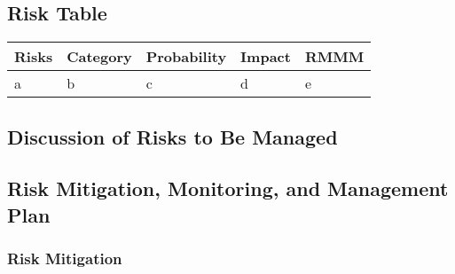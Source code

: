 \documentclass[english,12pt]{article}
\begin{document}
\subsection{Risk Table}
\begin{table}[H]
  \begin{center}
    \begin{tabular}[c]{|l|l|l|l|l|}
      \hline
      \multicolumn{1}{|c|}{\textbf{Risks}} & 
      \multicolumn{1}{|c|}{\textbf{Category}} & 
      \multicolumn{1}{|c|}{\textbf{Probability}} &
      \multicolumn{1}{|c|}{\textbf{Impact}} &
      \multicolumn{1}{|c|}{\textbf{RMMM}} \\
      \hline
      a & b & c & d & e\\
      \hline
    \end{tabular}
  \end{center}
\end{table}

\subsection{Discussion of Risks to Be Managed}

\subsection{Risk Mitigation, Monitoring, and Management Plan}

\subsubsection{Risk Mitigation}
\end{document}
